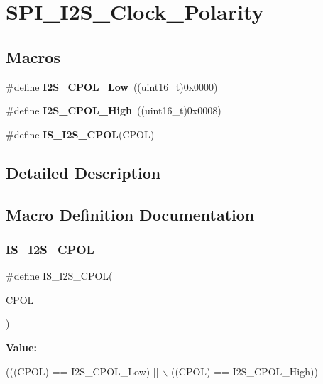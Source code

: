 \hypertarget{group___s_p_i___i2_s___clock___polarity}{}\section{S\+P\+I\+\_\+\+I2\+S\+\_\+\+Clock\+\_\+\+Polarity}
\label{group___s_p_i___i2_s___clock___polarity}
\subsection*{Macros}
\begin{DoxyCompactItemize}
\item 
\mbox{\label{group___s_p_i___i2_s___clock___polarity_gae859a63575e4af3e007fc5123fa901ab}} 
\#define {\bfseries I2\+S\+\_\+\+C\+P\+O\+L\+\_\+\+Low}~((uint16\+\_\+t)0x0000)
\item 
\mbox{\label{group___s_p_i___i2_s___clock___polarity_gae26f7f9fbde299fbdc0b81a2cc38bfdb}} 
\#define {\bfseries I2\+S\+\_\+\+C\+P\+O\+L\+\_\+\+High}~((uint16\+\_\+t)0x0008)
\item 
\#define {\bfseries I\+S\+\_\+\+I2\+S\+\_\+\+C\+P\+OL}(C\+P\+OL)
\end{DoxyCompactItemize}


\subsection{Detailed Description}


\subsection{Macro Definition Documentation}
\mbox{\label{group___s_p_i___i2_s___clock___polarity_ga6323375bf0b6fa6e2ee2a9ce6f9ef82f}} 
\subsubsection{\texorpdfstring{I\+S\+\_\+\+I2\+S\+\_\+\+C\+P\+OL}{IS\_I2S\_CPOL}}
{\footnotesize\ttfamily \#define I\+S\+\_\+\+I2\+S\+\_\+\+C\+P\+OL(\begin{DoxyParamCaption}\item[{}]{C\+P\+OL }\end{DoxyParamCaption})}

{\bfseries Value\+:}
\begin{DoxyCode}
(((CPOL) == I2S\_CPOL\_Low) || \(\backslash\)
                           ((CPOL) == I2S\_CPOL\_High))
\end{DoxyCode}
